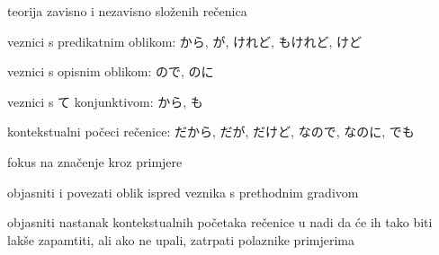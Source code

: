 
\author{Tomislav Mamić}

	
	
	\begin{hyou}
		\item teorija zavisno i nezavisno složenih rečenica
		\item veznici s predikatnim oblikom: から, が, けれど, もけれど, けど
		\item veznici s opisnim oblikom: ので, のに
		\item veznici s て konjunktivom: から, も
		\item kontekstualni počeci rečenice: だから, だが, だけど, なので, なのに, でも
	\end{hyou}

	
	\begin{hyou}
		\item fokus na značenje kroz primjere
		\item objasniti i povezati oblik ispred veznika s prethodnim gradivom
		\item objasniti nastanak kontekstualnih početaka rečenice u nadi da će ih tako biti lakše zapamtiti, ali ako ne upali, zatrpati polaznike primjerima
	\end{hyou}

